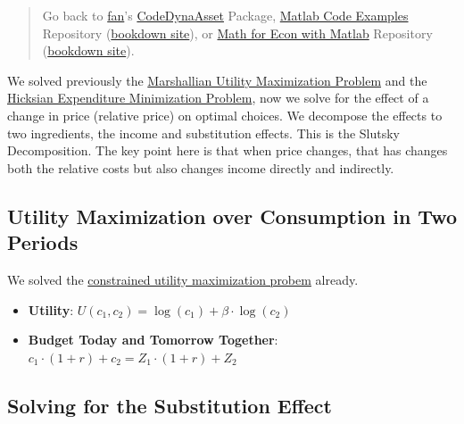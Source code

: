 \documentclass[
]{book}
\begin{document}
\begin{quote}
Go back to \href{http://fanwangecon.github.io/}{fan}'s \href{https://fanwangecon.github.io/CodeDynaAsset/}{CodeDynaAsset} Package, \href{https://fanwangecon.github.io/M4Econ/}{Matlab Code Examples} Repository (\href{https://fanwangecon.github.io/M4Econ/bookdown}{bookdown site}), or \href{https://fanwangecon.github.io/Math4Econ/}{Math for Econ with Matlab} Repository (\href{https://fanwangecon.github.io/Math4Econ/bookdown}{bookdown site}).
\end{quote}

We solved previously the \href{https://fanwangecon.github.io/Math4Econ/opti_hh_constrained_brsv/household_c1_c2_constrained.html}{Marshallian Utility Maximization
Problem}
and the \href{https://fanwangecon.github.io/Math4Econ/opti_hh_constrained_brsv/household_c1_c2_constrained_expmin.html}{Hicksian Expenditure Minimization
Problem},
now we solve for the effect of a change in price (relative price) on
optimal choices. We decompose the effects to two ingredients, the income
and substitution effects. This is the Slutsky Decomposition. The key
point here is that when price changes, that has changes both the
relative costs but also changes income directly and indirectly.

\hypertarget{utility-maximization-over-consumption-in-two-periods-2}{%
\subsection{Utility Maximization over Consumption in Two Periods}\label{utility-maximization-over-consumption-in-two-periods-2}}

We solved the \href{https://fanwangecon.github.io/Math4Econ/opti_hh_constrained_brsv/household_c1_c2_constrained.html}{constrained utility maximization
probem}
already.

\begin{itemize}
\item
  \textbf{Utility}: \(U(c_1 ,c_2 )=\log (c_1 )+\beta \cdot \log (c_2 )\)
\item
  \textbf{Budget Today and Tomorrow Together}:
  \(c_1 \cdot (1+r)+c_2 =Z_1 \cdot (1+r)+Z_2\)
\end{itemize}

\hypertarget{solving-for-the-substitution-effect}{%
\subsection{Solving for the Substitution Effect}\label{solving-for-the-substitution-effect}}
\end{document}
